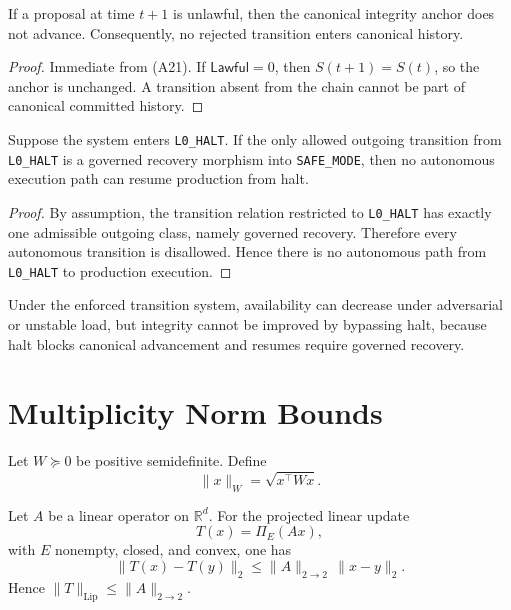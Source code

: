\documentclass[11pt]{article}
\begin{document}
\begin{proposition}
If a proposal at time \(t+1\) is unlawful, then the canonical integrity anchor does not advance. Consequently, no rejected transition enters canonical history.
\end{proposition}

\begin{proof}
Immediate from (A21). If \(\mathsf{Lawful}=0\), then \(S(t+1)=S(t)\), so the anchor is unchanged. A transition absent from the chain cannot be part of canonical committed history.
\end{proof}

\begin{proposition}
Suppose the system enters \texttt{L0\_HALT}. If the only allowed outgoing transition from \texttt{L0\_HALT} is a governed recovery morphism into \texttt{SAFE\_MODE}, then no autonomous execution path can resume production from halt.
\end{proposition}

\begin{proof}
By assumption, the transition relation restricted to \texttt{L0\_HALT} has exactly one admissible outgoing class, namely governed recovery. Therefore every autonomous transition is disallowed. Hence there is no autonomous path from \texttt{L0\_HALT} to production execution.
\end{proof}

\begin{corollary}
Under the enforced transition system, availability can decrease under adversarial or unstable load, but integrity cannot be improved by bypassing halt, because halt blocks canonical advancement and resumes require governed recovery.
\end{corollary}

\section{Multiplicity Norm Bounds}
\begin{definition}
Let \(W \succeq 0\) be positive semidefinite. Define
\[
\|x\|_{W} = \sqrt{x^\top W x}. \tag{A22}
\]
\end{definition}

\begin{proposition}
Let \(A\) be a linear operator on \(\mathbb{R}^d\). For the projected linear update
\[
T(x)=\Pi_E(Ax), \tag{A23}
\]
with \(E\) nonempty, closed, and convex, one has
\[
\|T(x)-T(y)\|_2 \le \|A\|_{2\to 2}\,\|x-y\|_2. \tag{A24}
\]
Hence \(\|T\|_{\mathrm{Lip}} \le \|A\|_{2\to 2}\).
\end{proposition}
\end{document}

